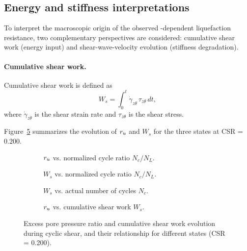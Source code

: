\subsection{Energy and stiffness interpretations}
\label{subsec:energy_stiffness}

To interpret the macroscopic origin of the observed \Kzero{}-dependent liquefaction resistance, two complementary perspectives are considered: cumulative shear work (energy input) and shear-wave-velocity evolution (stiffness degradation).

\paragraph{Cumulative shear work.}
Cumulative shear work is defined as \citep{TowhataIshihara1985}
\begin{equation}
W_s = \int_0^t \dot{\gamma}_{z\theta}\,\tau_{z\theta}\,dt,
\label{eq:cumulative_shear_work}
\end{equation}
where $\dot{\gamma}_{z\theta}$ is the shear strain rate and $\tau_{z\theta}$ is the shear stress.

Figure~\ref{fig:energy_work} summarizes the evolution of $r_u$ and $W_s$ for the three \Kzero{} states at CSR = 0.200.

\begin{figure}[t]
  \centering
  \begin{subfigure}[t]{0.48\textwidth}
    \centering
    \caption{$r_u$ vs. normalized cycle ratio $N_c/N_L$.}
    \label{fig:energy_work_a}
  \end{subfigure}
  \hfill
  \begin{subfigure}[t]{0.48\textwidth}
    \centering
    \caption{$W_s$ vs. normalized cycle ratio $N_c/N_L$.}
    \label{fig:energy_work_b}
  \end{subfigure}

  \vspace{0.5em}

  \begin{subfigure}[t]{0.48\textwidth}
    \centering
    \caption{$W_s$ vs. actual number of cycles $N_c$.}
    \label{fig:energy_work_c}
  \end{subfigure}
  \hfill
  \begin{subfigure}[t]{0.48\textwidth}
    \centering
    \caption{$r_u$ vs. cumulative shear work $W_s$.}
    \label{fig:energy_work_d}
  \end{subfigure}
  \caption{Excess pore pressure ratio and cumulative shear work evolution during cyclic shear, and their relationship for different \Kzero{} states (CSR = 0.200).}
  \label{fig:energy_work}
\end{figure}

